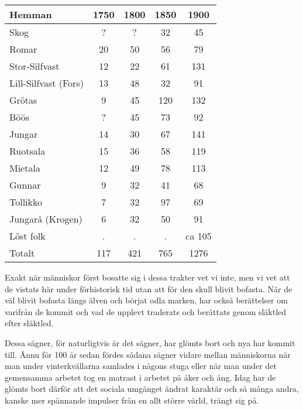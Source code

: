 \begin{center}
  \begin{tabular}{lcccc}
    \hline
    Hemman & 1750 & 1800 & 1850 & 1900 \\ \hline
    Skog & ? & ? & 32 & 45 \\
    Romar & 20 & 50 & 56 & 79 \\
    Stor-Silfvast & 12 & 22 & 61 & 131 \\
    Lill-Silfvast (Fors) & 13 & 48 & 32 & 91 \\
    Grötas & 9 & 45 & 120 & 132 \\
    Böös & ? & 45 & 73 & 92 \\
    Jungar & 14 & 30 & 67 & 141 \\
    Ruotsala & 15 & 36 & 58 & 119 \\
    Mietala & 12 & 49 & 78 & 113 \\
    Gunnar & 9 & 32 & 41 & 68 \\
    Tollikko & 7 & 32 & 97 & 69 \\
    Jungarå (Krogen) & 6 & 32 & 50 & 91 \\
    Löst folk & . & . & . & ca 105 \\ \hline
    Totalt & 117 & 421 & 765 & 1276 \\
    \hline
  \end{tabular}
\end{center}


Exakt när människor först bosatte sig i dessa trakter vet vi inte, men vi vet att de vistats här under förhistorisk tid utan att för den skull blivit bofasta. När de väl blivit bofasta längs älven och börjat odla marken, har också berättelser om varifrån de kommit och vad de upplevt traderats och berättats genom släktled efter släktled.

Dessa sägner, för naturligtvis är det sägner, har glömts bort och nya har kommit till. Ännu för 100 år sedan fördes sådana sägner vidare mellan människorna när man under vinterkvällarna samlades i någons stuga eller när man under det gemensamma arbetet tog en matrast i arbetet på åker och äng. Idag har de glömts bort därför att det sociala umgänget ändrat karaktär och så många andra, kanske mer spännande impulser från en allt större värld, trängt sig på.
